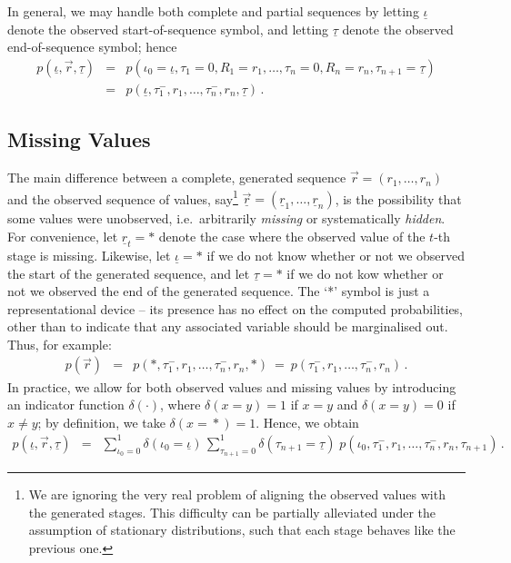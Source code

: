 \documentclass[a4paper]{article}
\newcommand{\ui}{\underline{\iota}}
\newcommand{\ut}{\underline{\tau}}
\newcommand{\ur}{\underline{r}}
\newcommand{\vr}{\vec{r}}
\newcommand{\uvr}{\underline{\vr}}
\newcommand{\tm}{\tau^{-}}
\begin{document}
In general, we may handle both complete and partial sequences by letting $\ui$ denote the observed start-of-sequence symbol, and
letting $\ut$ denote the observed end-of-sequence symbol; hence
\begin{eqnarray}
p(\ui,\vr,\ut)
& = & p(\iota_0\!=\!\ui,\tau_1\!=\!0,R_1\!=\!r_1,\ldots,\tau_n\!=\!0,R_n\!=\!r_n,\tau_{n+1}\!=\!\ut)
\nonumber\\
& = & p(\ui,\tm_1,r_1,\ldots,\tm_n,r_n,\ut)\,.
\label{eq:pr:gen}
\end{eqnarray}

\subsection{Missing Values}\label{sec:missing-values}

The main difference between a complete, generated sequence $\vr=(r_1,\ldots,r_n)$
and the observed sequence of values, say\footnote{We are ignoring the very real problem
of aligning the observed values with the generated stages. This difficulty can be partially alleviated under the assumption of stationary distributions, such that each stage behaves
like the previous one.} 
$\uvr=(\ur_1,\ldots,\ur_n)$, 
is the possibility that some values were unobserved, i.e.\ arbitrarily {\em missing} or systematically {\em hidden}.
For convenience, let $\ur_t=*$ denote the case where the  observed value of the $t$-th stage is missing.
Likewise, let $\ui=*$ if we do not know whether or not we observed the start of the generated sequence,
and let $\ut=*$ if we do not kow whether or not we observed the end of the generated sequence.
The `*' symbol is just a representational device -- its presence has no effect on the computed probabilities, other than to indicate that any associated variable should be marginalised out. Thus, for example:
\begin{eqnarray}
p(\vr) 
& = & p(*,\tm_1,r_1,\ldots,\tm_n,r_n,*)~=~p(\tm_1,r_1,\ldots,\tm_n,r_n)\,.
\end{eqnarray}
In practice, we allow for both observed values and missing values by introducing an indicator function $\delta(\cdot)$,
where $\delta(x\!=\!y)=1$ if $x=y$ and $\delta(x\!=\!y)=0$ if $x\ne y$;  by definition, we take $\delta(x\!=\!*)=1$.
Hence, we obtain
\begin{eqnarray}
p(\ui,\vr,\ut) 
& = & 
\sum_{\iota_0=0}^{1}\delta(\iota_0\!=\!\ui)
\,\sum_{\tau_{n+1}=0}^{1}\delta(\tau_{n+1}\!=\!\ut)\;
p(\iota_0,\tm_1,r_1,\ldots,\tm_n,r_n,\tau_{n+1})\,.
\end{eqnarray}
\end{document}
